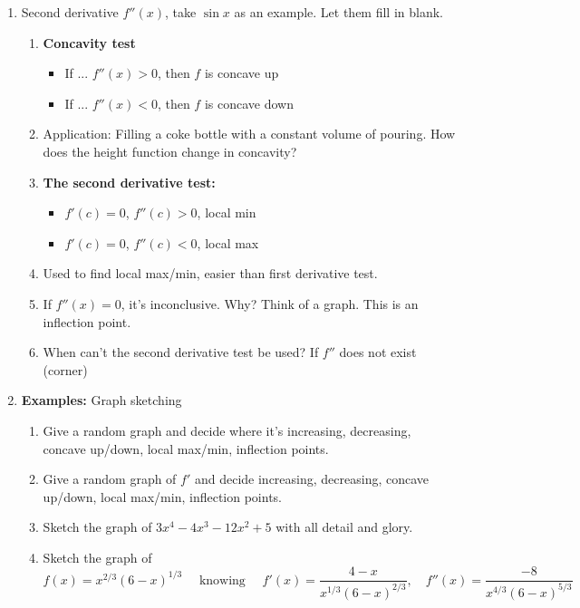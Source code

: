 \documentclass{article}
\begin{document}
\begin{enumerate}
\item Second derivative $f''(x)$, take $\sin x$ as an example. Let them fill in blank.
\begin{enumerate}
\item {\bf Concavity test}
\begin{itemize}
\item If ... $f''(x)>0$, then $f$ is  concave up
\item If ... $f''(x)<0$, then $f$ is  concave down
\end{itemize}
\item Application: Filling a coke bottle with a constant volume of pouring. How does the height function change in concavity?
\item {\bf The second derivative test: }
\begin{itemize}
\item $f'(c) = 0$, $f''(c) >0$, local min
\item $f'(c)=0$, $f''(c)<0$, local max
\end{itemize}
\item Used to find local max/min, easier than first derivative test.
\item If $f''(x)=0$, it's inconclusive. Why? Think of a graph. This is an inflection point.
\item When can't the second derivative test be used? If $f''$ does not exist (corner)
\end{enumerate}

\item {\bf Examples:} Graph sketching
\begin{enumerate}
\item Give a random graph and decide where it's increasing, decreasing, concave up/down, local max/min, inflection points.
\item Give a random graph of $f'$ and decide increasing, decreasing, concave up/down, local max/min, inflection points.
\item Sketch the graph of $3x^4-4x^3-12x^2+5$ with all detail and glory.
\item  Sketch the graph of 
$$
f(x) = x^{2/3}(6-x)^{1/3}\quad \text{ knowing } \quad f'(x) = \frac{4-x}{x^{1/3}(6-x)^{2/3}},\quad f''(x) = \frac{-8}{x^{4/3}(6-x)^{5/3}}
$$
\end{enumerate}
\end{enumerate}



\end{document}
